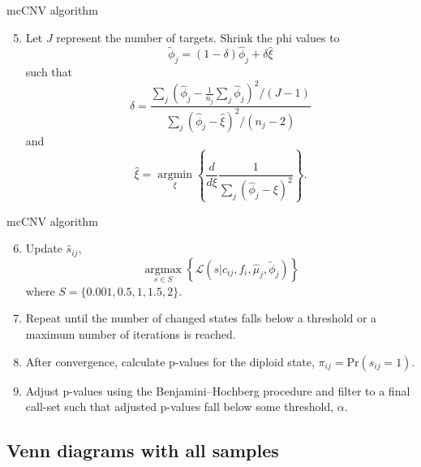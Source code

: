 \documentclass[
  10pt,
  ignorenonframetext,
  m]{beamer}
\providecommand{\tightlist}{%
  \setlength{\itemsep}{0pt}\setlength{\parskip}{0pt}}
\begin{document}
\begin{frame}{mcCNV algorithm}
\protect\hypertarget{mccnv-algorithm-3}{}

\begin{enumerate}
\setcounter{enumi}{4}
\tightlist
\item
  Let \(J\) represent the number of targets. Shrink the phi values to \[
    \tilde\phi_j = (1 - \delta)\hat\phi_j + \delta\hat{\xi}
    \] such that \[
    \delta = \frac{\sum\limits_j\left(\hat\phi_j - \frac{1}{n_j}\sum\limits_j \hat\phi_j\right)^2/(J - 1)}
    {\sum\limits_j\left(\hat\phi_j - \hat{\xi}\right)^2/(n_j - 2)}
    \] and \[
    \hat{\xi} = \mathop{\text{argmin}}\limits_{\xi}\left\{
    \frac{d}{d\xi}\frac{1}{\sum\limits_j \left(\hat\phi_j - \xi\right)^2}
    \right\}.
    \]
\end{enumerate}

\end{frame}

\begin{frame}{mcCNV algorithm}
\protect\hypertarget{mccnv-algorithm-4}{}

\begin{enumerate}
\setcounter{enumi}{5}
\item
  Update \(\hat{s}_{ij}\), \[
    \mathop{\text{argmax}}\limits_{s \in S}\left\{
    \mathcal{L}(s \rvert c_{ij},f_i,\hat\mu_j,\tilde\phi_j)
    \right\}
    \] where \(S = \{0.001, 0.5, 1, 1.5, 2\}\).
\item
  Repeat until the number of changed states falls below a threshold or a
  maximum number of iterations is reached.
\item
  After convergence, calculate p-values for the diploid state,
  \(\pi_{ij} = \text{Pr}(s_{ij} = 1)\).
\item
  Adjust p-values using the Benjamini--Hochberg procedure and filter to
  a final call-set such that adjusted p-values fall below some
  threshold, \(\alpha\).
\end{enumerate}

\end{frame}

\hypertarget{venn-diagrams-with-all-samples}{%
\subsection{Venn diagrams with all
samples}\label{venn-diagrams-with-all-samples}}
\end{document}
